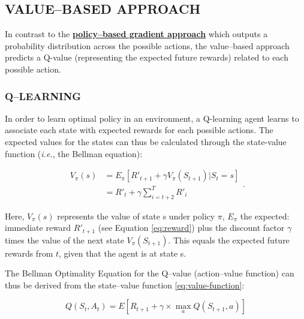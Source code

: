 \documentclass{article}
\let\oldhyperlink\hyperlink
\renewcommand{\hyperlink}[2]{\oldhyperlink{#1}{\textbf{#2}}}
\let\oldcite\cite
\renewcommand{\cite}[1]{\textbf{\oldcite{#1}}}
\renewenvironment{leftbar}[1][\hsize]{
    \def\FrameCommand{{\color{barcolor}\vrule width 0.5pt \hspace{10pt}}}
    \MakeFramed{\hsize#1 \advance\hsize-\width \FrameRestore}
}{\endMakeFramed}
\begin{document}
\subsection*{\normalsize VALUE–BASED APPROACH}
\begin{leftbar}
    In contrast to the \hyperlink{sec:policy-based-approach}{policy–based gradient approach} which outputs a probability distribution across the possible actions, the value–based approach predicts a Q-value (representing the expected future rewards) related to each possible action. \cite{HF-value}

    \hypertarget{sec:value-based-approach}{}
    \subsubsection*{Q–LEARNING}

    In order to learn optimal policy in an environment, a Q-learning agent learns to associate each state with expected rewards for each possible actions. The expected values for the states can thus be calculated through the state-value function (\textit{i.e.}, the Bellman equation):

    \begin{equation}
        \begin{split}
            V_\pi (s) &= E_\pi \left[ R'_{t+1} + \gamma V_\pi (S_{t+1}) | S_t = s \right] \\
             &= R'_t + \gamma \sum_{i=t+2}^T R'_i
        \end{split}
        \label{eq:value-function}.
    \end{equation}

    Here, $V_\pi (s)$ represents the value of state s under policy $\pi$, $E_\pi$ the expected: immediate reward $R'_{t+1}$ (see Equation \eqref{eq:reward}) plus the discount factor $\gamma$ times the value of the next state $V_\pi (S_{t+1})$. This equals the expected future rewards from $t$, given that the agent is at state s. \cite{HF-bellman} \cite{Q-traditional} \cite{Technical-Q-learning}

    The Bellman Optimality Equation for the Q–value (action–value function) can thus be derived from the state–value function \eqref{eq:value-function}:

    \begin{equation}
        Q(S_t, A_t) = E \left[ R_{t+1} + \gamma \times \max_a Q(S_{t+1}, a) \right]
        \label{eq:q-value}
    \end{equation}


\end{leftbar}
\end{document}

